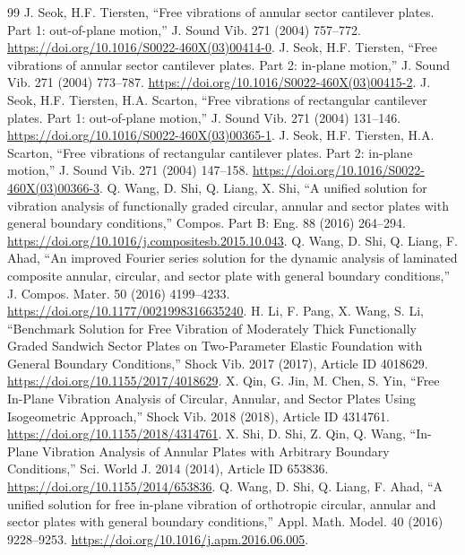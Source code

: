 \documentclass[11pt]{article}
\begin{document}
\begin{thebibliography}{99}\small
\setlength{\itemsep}{0pt}
\setlength{\parsep}{0pt}
 J. Seok, H.F. Tiersten, ``Free vibrations of annular sector
cantilever plates. Part 1: out-of-plane motion,'' J. Sound Vib. 271 (2004)
757--772. \url{https://doi.org/10.1016/S0022-460X(03)00414-0}.
 J. Seok, H.F. Tiersten, ``Free vibrations of annular sector
cantilever plates. Part 2: in-plane motion,'' J. Sound Vib. 271 (2004)
773--787. \url{https://doi.org/10.1016/S0022-460X(03)00415-2}.
 J. Seok, H.F. Tiersten, H.A. Scarton, ``Free vibrations of
rectangular cantilever plates. Part 1: out-of-plane motion,'' J. Sound
Vib. 271 (2004) 131--146. \url{https://doi.org/10.1016/S0022-460X(03)00365-1}.
 J. Seok, H.F. Tiersten, H.A. Scarton, ``Free vibrations of
rectangular cantilever plates. Part 2: in-plane motion,'' J. Sound Vib.
271 (2004) 147--158. \url{https://doi.org/10.1016/S0022-460X(03)00366-3}.
 Q. Wang, D. Shi, Q. Liang, X. Shi, ``A unified solution
for vibration analysis of functionally graded circular, annular and
sector plates with general boundary conditions,'' Compos. Part B: Eng.
88 (2016) 264--294. \url{https://doi.org/10.1016/j.compositesb.2015.10.043}.
 Q. Wang, D. Shi, Q. Liang, F. Ahad, ``An improved Fourier
series solution for the dynamic analysis of laminated composite annular,
circular, and sector plate with general boundary conditions,'' J. Compos.
Mater. 50 (2016) 4199--4233. \url{https://doi.org/10.1177/0021998316635240}.
 H. Li, F. Pang, X. Wang, S. Li, ``Benchmark Solution
for Free Vibration of Moderately Thick Functionally Graded Sandwich Sector
Plates on Two-Parameter Elastic Foundation with General Boundary
Conditions,'' Shock Vib. 2017 (2017), Article ID 4018629.
\url{https://doi.org/10.1155/2017/4018629}.
 X. Qin, G. Jin, M. Chen, S. Yin, ``Free In-Plane
Vibration Analysis of Circular, Annular, and Sector Plates Using
Isogeometric Approach,'' Shock Vib. 2018 (2018), Article ID 4314761.
\url{https://doi.org/10.1155/2018/4314761}.
 X. Shi, D. Shi, Z. Qin, Q. Wang, ``In-Plane Vibration
Analysis of Annular Plates with Arbitrary Boundary Conditions,'' Sci.
World J. 2014 (2014), Article ID 653836.
\url{https://doi.org/10.1155/2014/653836}.
 Q. Wang, D. Shi, Q. Liang, F. Ahad, ``A unified
solution for free in-plane vibration of orthotropic circular, annular and
sector plates with general boundary conditions,'' Appl. Math. Model. 40
(2016) 9228--9253. \url{https://doi.org/10.1016/j.apm.2016.06.005}.

\end{thebibliography}
\end{document}
